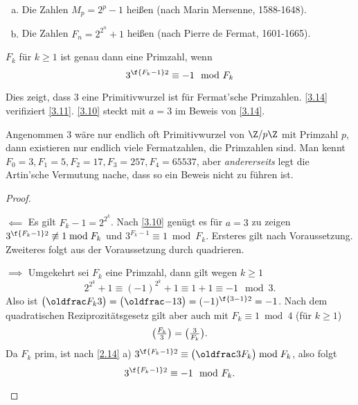 \begin{df} \label{3.13}
	\begin{enumerate}[a)]
		\item
			Die Zahlen $M_p = 2^p - 1$ heißen  (nach Marin Mersenne, 1588-1648).
		\item
			Die Zahlen $F_n = 2^{2^n} + 1$ heißen  (nach Pierre de Fermat, 1601-1665).
	\end{enumerate}
\end{df}

\begin{st} \label{3.14}
	$F_k$ für $k \ge 1$ ist genau dann eine Primzahl, wenn
	\[
		3^{\f{F_k - 1}2} \equiv -1 \mod F_k
	\]
	\begin{note}
		Dies zeigt, dass $3$ eine Primitivwurzel ist für Fermat'sche Primzahlen.
		\ref{3.14} verifiziert \ref{3.11}.
		\ref{3.10} steckt mit $a = 3$ im Beweis von \ref{3.14}.

		Angenommen $3$ wäre nur endlich oft Primitivwurzel von $\Z / p\Z$ mit Primzahl $p$, dann existieren nur endlich viele Fermatzahlen, die Primzahlen sind.
		Man kennt $F_0 = 3, F_1 = 5, F_2 = 17, F_3 = 257, F_4 = 65537$, aber \emph{andererseits} legt die Artin'sche Vermutung nache, dass so ein Beweis nicht zu führen ist.
	\end{note}
	\begin{proof}
		\begin{segnb}{$\impliedby$}
			Es gilt $F_k - 1 = 2^{2^k}$.
			Nach \ref{3.10} genügt es für $a = 3$ zu zeigen $3^{\f{F_k - 1}2} \not\equiv 1 \bmod F_k$ und $3^{F_k-1} \equiv 1 \bmod F_k$.
			Ersteres gilt nach Voraussetzung.
			Zweiteres folgt aus der Voraussetzung durch quadrieren.
		\end{segnb}
		\begin{segnb}{$\implies$}
			Umgekehrt sei $F_k$ eine Primzahl, dann gilt wegen $k \ge 1$
			\[
				2^{2^k} + 1
				\equiv (-1)^{2^k} + 1
				\equiv 1 + 1
				\equiv -1
				\mod 3.
			\]
			Also ist $\legsym{F_k}{3} = \legsym{-1}{3} = (-1)^{\f{3-1}2} = -1$.
			Nach dem quadratischen Reziprozitätsgesetz gilt aber auch mit $F_k \equiv 1 \bmod 4$ (für $k \ge 1$)
			\[
				\legsym{F_k}{3}
				= \legsym{3}{F_k}.
			\]
			Da $F_k$ prim, ist nach \ref{2.14} a) $3^{\f{F_k - 1}2} \equiv \legsym{3}{F_k} \bmod F_k$, also folgt
			\[
				3^{\f{F_k-1}2} \equiv -1 \mod F_k.
			\]
		\end{segnb}
	\end{proof}
\end{st}

